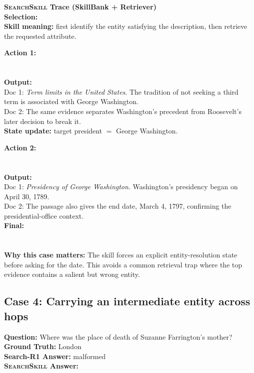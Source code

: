 \documentclass{article}
\newcommand{\Ours}{\textsc{SearchSkill}\xspace}
\begin{document}
\casedash
\noindent\textcolor{blue!75!black}{\textbf{\Ours Trace (SkillBank + Retriever)}}\\
\textbf{Selection:} \\
\textbf{Skill meaning:} first identify the entity satisfying the description, then retrieve the requested attribute.

\textbf{Action 1:}\\
\\
\\
\textbf{Output:}\\
Doc 1: \emph{Term limits in the United States}. The tradition of not seeking a third term is associated with George Washington.\\
Doc 2: The same evidence separates Washington's precedent from Roosevelt's later decision to break it.\\
\textbf{State update:} target president \(=\) George Washington.

\textbf{Action 2:}\\
\\
\\
\textbf{Output:}\\
Doc 1: \emph{Presidency of George Washington}. Washington's presidency began on April 30, 1789.\\
Doc 2: The passage also gives the end date, March 4, 1797, confirming the presidential-office context.\\
\textbf{Final:}\\
\\
\\
\textbf{Why this case matters:} The skill forces an explicit entity-resolution state before asking for the date. This avoids a common retrieval trap where the top evidence contains a salient but wrong entity.
\casehr

\subsection{Case 4: Carrying an intermediate entity across hops}
\casehr
\small
\noindent\textbf{Question:} Where was the place of death of Suzanne Farrington's mother?\\
\textbf{Ground Truth:} London\\
\textbf{Search-R1 Answer:} malformed \\
\textbf{\Ours Answer:} 
\end{document}
